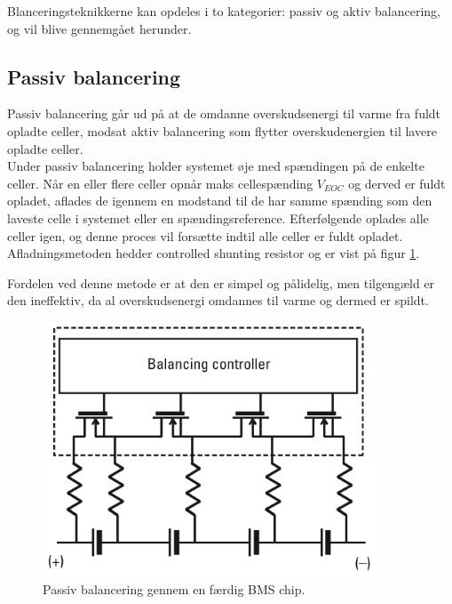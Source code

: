 Blanceringsteknikkerne kan opdeles i to kategorier: passiv og aktiv balancering, og vil blive gennemgået herunder.






\subsection{Passiv balancering}
Passiv balancering går ud på at de omdanne overskudsenergi til varme fra fuldt opladte celler, modsat aktiv balancering som flytter overskudenergien til lavere opladte celler.
\\

Under passiv balancering holder systemet øje med spændingen på de enkelte celler. Når en eller flere celler opnår maks cellespænding $V_{EOC}$ og derved er fuldt opladet, aflades de igennem en modstand til de har samme spænding som den laveste celle i systemet eller en spændingsreference. Efterfølgende oplades alle celler igen, og denne proces vil forsætte indtil alle celler er fuldt opladet. Afladningsmetoden hedder controlled shunting resistor og er vist på figur \ref{fig:passiv_balancering_teknik}. 



Fordelen ved denne metode er at den er simpel og pålidelig, men tilgengæld er den ineffektiv, da al overskudsenergi omdannes til varme og dermed er spildt.

\begin{figure}[h]
	\centering
	\includegraphics[width=10cm]{billeder/passiv_balancering.png}
	\caption{Passiv balancering gennem en færdig BMS chip.}
	\label{fig:passiv_balancering_teknik}
\end{figure}




